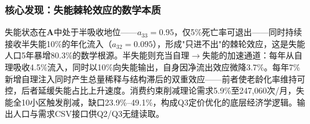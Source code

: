 \subsubsection{核心发现：失能棘轮效应的数学本质}

失能状态在$\mathbf{A}$中处于半吸收地位——$a_{33}=0.95$，仅5\%死亡率可退出——同时持续接收半失能10\%的年化流入（$a_{32}=0.095$），形成"只进不出"的棘轮效应，这是失能人口5年暴增80.3\%的数学根源。半失能则充当自理$\to$失能的加速通道：每年从自理吸收4.5\%流入，同时以10\%向失能输出，自身因净流出效应微降3.7\%。每年7\%新增自理注入同时产生总量稀释与结构滞后的双重效应——前者使老龄化率维持可控，后者延缓失能占比上升速度。消费约束削减理论需求5.9\%至247,060次/月，失能全10小区触发削减，缺口23.9\%--49.1\%，构成Q3定价优化的底层经济学逻辑。输出人口与需求CSV接口供Q2/Q3无缝读取。
